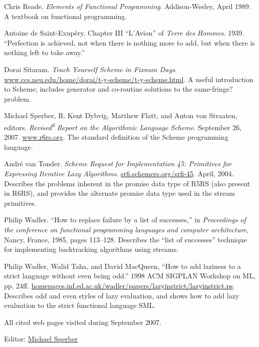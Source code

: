Chris Reade. \emph{Elements of Functional Programming}. Addison-Wesley,
April 1989. A textbook on functional programming.

Antoine de Saint-Exupéry. Chapter III ``L'Avion'' of \emph{Terre des
Hommes}. 1939. ``Perfection is achieved, not when there is nothing more
to add, but when there is nothing left to take away.''

Dorai Sitaram. \emph{Teach Yourself Scheme in Fixnum Days}.
\href{http://www.ccs.neu.edu/home/dorai/t-y-scheme/t-y-scheme.html}{www.ccs.neu.edu/home/dorai/t-y-scheme/t-y-scheme.html}.
A useful introduction to Scheme; includes generator and co-routine
solutions to the same-fringe? problem.

Michael Sperber, R. Kent Dybvig, Matthew Flatt, and Anton von Straaten,
editors. \emph{Revised}\textsuperscript{\emph{6}} \emph{Report on the
Algorithmic Language Scheme}. September 26, 2007.
\href{http://www.r6rs.org}{www.r6rs.org}. The standard definition of the
Scheme programming language.

André van Tonder. \emph{Scheme Request for Implementation 45: Primitives
for Expressing Iterative Lazy Algorithms}.
\href{http://srfi.schemers.org/srfi-45}{srfi.schemers.org/srfi-45}.
April, 2004. Describes the problems inherent in the promise data type of
R5RS (also present in R6RS), and provides the alternate promise data
type used in the stream primitives.

Philip Wadler. ``How to replace failure by a list of successes,'' in
\emph{Proceedings of the conference on functional programming languages
and computer architecture}, Nancy, France, 1985, pages 113--128.
Describes the ``list of successes'' technique for implementing
backtracking algorithms using streams.

Philip Wadler, Walid Taha, and David MacQueen, ``How to add laziness to
a strict language without even being odd.'' 1998 ACM SIGPLAN Workshop on
ML, pp. 24ff.
\href{http://homepages.inf.ed.ac.uk/wadler/papers/lazyinstrict/lazyinstrict.ps}{homepages.inf.ed.ac.uk/wadler/papers/lazyinstrict/lazyinstrict.ps}.
Describes odd and even styles of lazy evaluation, and shows how to add
lazy evaluation to the strict functional language SML.

All cited web pages visited during September 2007.

Editor:
\href{mailto:srfi-editors\%20at\%20srfi\%20dot\%20schemers\%20dot\%20org}{Michael
Sperber}
